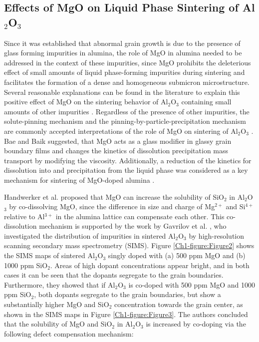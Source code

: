 \subsection{Effects of MgO on Liquid Phase Sintering of Al$_{2}$O$_{3}$}
Since it was established that abnormal grain growth is due to the presence of glass forming impurities in alumina, the role of MgO in alumina needed to be addressed in the context of these impurities, since MgO prohibits the deleterious effect of small amounts of liquid phase-forming impurities during sintering and facilitates the formation of a dense and homogeneous submicron microstructure. Several reasonable explanations can be found in the literature to explain this positive effect of MgO on the sintering behavior of Al$_{2}$O$_{3}$ containing small amounts of other impurities \cite{Bateman1989,Bennison1990}. Regardless of the presence of other impurities, the solute-pinning mechanism and the pinning-by-particle-precipitation mechanism are commonly accepted interpretations of the role of MgO on sintering of Al$_{2}$O$_{3}$ \cite{Soni1995,Bennison1983}. Bae and Baik \cite{Bae1994} suggested, that MgO acts as a glass modifier in glassy grain boundary films and changes the kinetics of dissolution precipitation mass transport by modifying the viscosity. Additionally, a reduction of the kinetics for dissolution into and precipitation from the liquid phase was considered as a key mechanism for sintering of MgO-doped alumina \cite{Bateman1989,Bennison1990}. 

Handwerker et al. \cite{Handwerker1989} proposed that MgO can increase the solubility of SiO$_{2}$ in Al$_{2}$O$_{3}$ by co-dissolving MgO, since the difference in size and charge of Mg$^{2+}$ and Si$^{4+}$ relative to Al$^{3+}$ in the alumina lattice can compensate each other. This co-dissolution mechanism is supported by the work by Gavrilov et al. \cite{Gavrilov1999}, who investigated the distribution of impurities in sintered Al$_{2}$O$_{3}$ by high-resolution scanning secondary mass spectrometry (SIMS). Figure \ref{Ch1-figure:Figure2} shows the SIMS maps of sintered Al$_{2}$O$_{3}$ singly doped with (a) 500 ppm MgO and (b) 1000 ppm SiO$_{2}$. Areas of high dopant concentrations appear bright, and in both cases it can be seen that the dopants segregate to the grain boundaries. Furthermore, they showed that if Al$_{2}$O$_{3}$ is co-doped with 500 ppm MgO and 1000 ppm SiO$_{2}$, both dopants segregate to the grain boundaries, but show a substantially higher MgO and SiO$_{2}$ concentration towards the grain center, as shown in the SIMS maps in Figure \ref{Ch1-figure:Figure3}. The authors concluded that the solubility of MgO and SiO$_{2}$ in Al$_{2}$O$_{3}$ is increased by co-doping via the following defect compensation mechanism:

